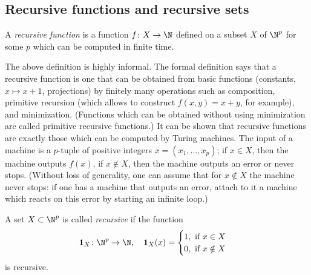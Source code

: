\begin{page}
\setcounter{section}{3}
\setcounter{subsection}{4}
\setcounter{dfn}{24}
\label{portion:651}

\subsection{Recursive functions and recursive sets}

\end{page}

\begin{page}
\setcounter{section}{3}
\setcounter{subsection}{4}
\setcounter{dfn}{25}
\label{portion:653}

\begin{dfn}
A \emph{recursive function} is a function $f \colon X \to \N$ defined on a subset $X$ of $\N^p$ for some $p$
which can be computed in finite time.
\end{dfn}

\end{page}

\begin{page}
\setcounter{section}{3}
\setcounter{subsection}{4}
\setcounter{dfn}{25}
\label{portion:654}

The above definition is highly informal.
The formal definition says that a recursive function is one that can be obtained from basic functions
(constants, $x \mapsto x+1$, projections) by finitely many operations such as composition,
primitive recursion (which allows to construct $f(x,y) = x+y$, for example), and minimization.
(Functions which can be obtained without using minimization are called primitive recursive functions.)
It can be shown that recursive functions are exactly those which can be computed by Turing machines.
The input of a machine is a $p$-tuple of positive integers $x = (x_1, \ldots, x_p)$;
if $x \in X$, then the machine outputs $f(x)$, if $x \notin X$, then the machine outputs an error or never stops.
(Without loss of generality, one can assume that for $x \notin X$ the machine never stops: if one has a machine that outputs an error,
attach to it a machine which reacts on this error by starting an infinite loop.)



\end{page}

\begin{page}
\setcounter{section}{3}
\setcounter{subsection}{4}
\setcounter{dfn}{26}
\label{portion:656}

\begin{dfn}
A set $X \subset \N^p$ is called \emph{recursive} if the function
\[
\mathbf{1}_X \colon \N^p \to \N, \quad \mathbf{1}_X(x) =
\begin{cases}
1, \text{ if }x \in X\\
0, \text{ if }x \notin X
\end{cases}
\]
is recursive.
\end{dfn}

\end{page}

